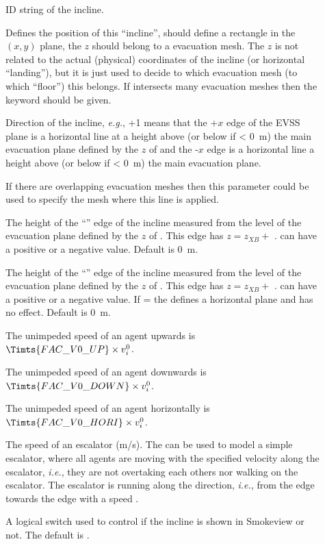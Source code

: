 \documentclass[12pt,a4paper,final,twoside]{stylevk}
\begin{document}
\begin{description}
%
%
\item[] ID string of the incline.
%
\item[] Defines the position of this ``incline'', should
  define a rectangle in the $(x,y)$ plane, the $z$ should belong to a
  evacuation mesh.  The $z$ is not related to the actual (physical)
  coordinates of the incline (or horizontal ``landing''), but it is
  just used to decide to which evacuation mesh (to which ``floor'')
  this  belongs.  If  intersects many evacuation
  meshes then the keyword  should be given.
%
\item[] Direction of the incline, \emph{e.g.}, +1 means
  that the +$x$ edge of the EVSS plane is a horizontal line at a
  height  above (or below if < 0~m) the main evacuation
  plane defined by the $z$ of  and the -$x$ edge is a
  horizontal line a height  above (or below if < 0~m)
  the main evacuation plane.
%
\item[] If there are overlapping evacuation meshes
  then this parameter could be used to specify the mesh where this
   line is applied.
%
\item[] The height of the ``'' edge of the
  incline measured from the level of the evacuation plane defined by
  the $z$ of .  This edge has $z = z_{\scriptscriptstyle XB}
  +$ .   can have a positive or a negative
  value.  Default is 0~m.
%
\item[] The height of the ``'' edge of the
  incline measured from the level of the evacuation plane defined by
  the $z$ of .  This edge has $z = z_{\scriptscriptstyle XB}
  +$ .   can have a positive or a
  negative value.  If = the 
  defines a horizontal plane and  has no effect.  Default
  is 0~m.
%
\item[] The unimpeded speed of an agent upwards is
  $\Timts{FAC\_V0\_UP} \times v_i^0$.
%
\item[] The unimpeded speed of an agent downwards
  is $\Timts{FAC\_V0\_DOWN} \times v_i^0$.
%
\item[] The unimpeded speed of an agent
  horizontally is $\Timts{FAC\_V0\_HORI} \times
  v_i^0$.
%
\item[] The speed of an escalator (m/s).  The
   can be used to model a simple escalator, where all
  agents are moving with the specified velocity 
  along the escalator, \emph{i.e.}, they are not overtaking each
  others nor walking on the escalator.  The escalator is running along
  the  direction, \emph{i.e.}, from the 
  edge towards the  edge with a speed
  .
%
\item[] A logical switch used to control if the incline is
  shown in Smokeview or not.  The default is .
%
\end{description}
%
\end{document}
